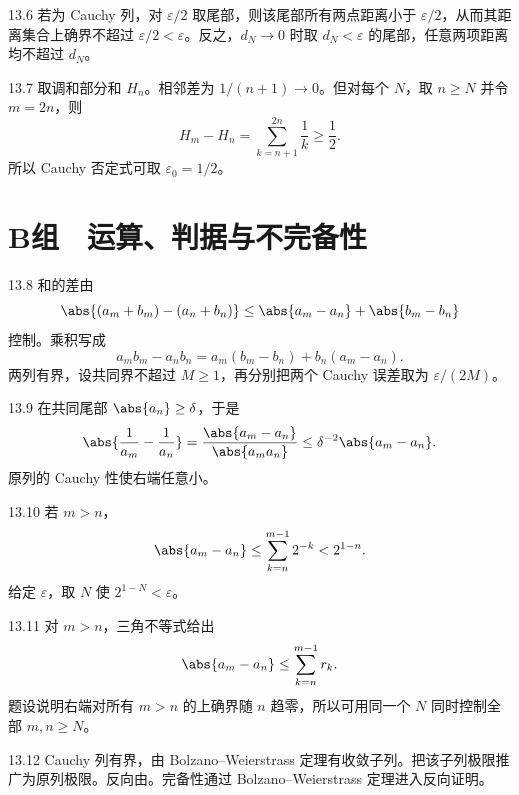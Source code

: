 \begin{solution}{13.6}
若为 Cauchy 列，对 \(\varepsilon/2\) 取尾部，则该尾部所有两点距离小于 \(\varepsilon/2\)，从而其距离集合上确界不超过 \(\varepsilon/2<\varepsilon\)。反之，\(d_N\to0\) 时取 \(d_N<\varepsilon\) 的尾部，任意两项距离均不超过 \(d_N\)。
\end{solution}

\begin{solution}{13.7}
取调和部分和 \(H_n\)。相邻差为 \(1/(n+1)\to0\)。但对每个 \(N\)，取
\(n\ge N\) 并令 \(m=2n\)，则
\[
 H_m-H_n=\sum_{k=n+1}^{2n}\frac1k\ge\frac12.
\]
所以 Cauchy 否定式可取 \(\varepsilon_0=1/2\)。
\end{solution}

\section*{B组　运算、判据与不完备性}

\begin{solution}{13.8}
和的差由
\[
 \abs{(a_m+b_m)-(a_n+b_n)}
 \le\abs{a_m-a_n}+\abs{b_m-b_n}
\]
控制。乘积写成
\[
 a_mb_m-a_nb_n=a_m(b_m-b_n)+b_n(a_m-a_n).
\]
两列有界，设共同界不超过 \(M\ge1\)，再分别把两个 Cauchy 误差取为 \(\varepsilon/(2M)\)。
\end{solution}

\begin{solution}{13.9}
在共同尾部 \(\abs{a_n}\ge\delta\)，于是
\[
 \abs{\frac1{a_m}-\frac1{a_n}}
 =\frac{\abs{a_m-a_n}}{\abs{a_ma_n}}
 \le\delta^{-2}\abs{a_m-a_n}.
\]
原列的 Cauchy 性使右端任意小。
\end{solution}

\begin{solution}{13.10}
若 \(m>n\)，
\[
 \abs{a_m-a_n}
 \le\sum_{k=n}^{m-1}2^{-k}<2^{1-n}.
\]
给定 \(\varepsilon\)，取 \(N\) 使 \(2^{1-N}<\varepsilon\)。
\end{solution}

\begin{solution}{13.11}
对 \(m>n\)，三角不等式给出
\[
 \abs{a_m-a_n}\le\sum_{k=n}^{m-1}r_k.
\]
题设说明右端对所有 \(m>n\) 的上确界随 \(n\) 趋零，所以可用同一个 \(N\) 同时控制全部 \(m,n\ge N\)。
\end{solution}

\begin{solution}{13.12}
Cauchy 列有界，由 Bolzano--Weierstrass 定理有收敛子列。把该子列极限推广为原列极限。反向由。完备性通过 Bolzano--Weierstrass 定理进入反向证明。
\end{solution}

